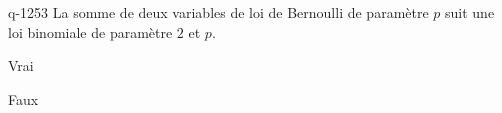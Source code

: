 \begin{truefalse}{q-1253}
La somme de deux variables de loi de Bernoulli de paramètre $p$ suit une loi binomiale de paramètre $2$ et $p$.
\item Vrai
\item* Faux
\end{truefalse}

